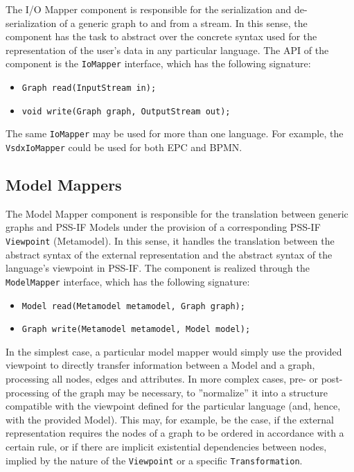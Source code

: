 The I/O Mapper component is responsible for the serialization and de-serialization of a generic graph to and from a stream. In this sense, the component has the task to abstract over the concrete syntax used for the representation of the user's data in any particular language. The API of the component is the \texttt{IoMapper} interface, which has the following signature:

\begin{itemize}
\item \texttt{Graph read(InputStream in);}
\item \texttt{void write(Graph graph, OutputStream out);}
\end{itemize}

The same \texttt{IoMapper} may be used for more than one language. For example, the \texttt{VsdxIoMapper} could be used for both EPC and BPMN.

\subsection{Model Mappers}
\label{sec:impl:comp:model}

The Model Mapper component is responsible for the translation between generic graphs and PSS-IF Models under the provision of a corresponding PSS-IF \texttt{Viewpoint} (Metamodel). In this sense, it handles the translation between the abstract syntax of the external representation and the abstract syntax of the language's viewpoint in PSS-IF. The component is realized through the \texttt{ModelMapper} interface, which has the following signature:

\begin{itemize}
\item \texttt{Model read(Metamodel metamodel, Graph graph);}
\item \texttt{Graph write(Metamodel metamodel, Model model);}
\end{itemize}

In the simplest case, a particular model mapper would simply use the provided viewpoint to directly transfer information between a Model and a graph, processing all nodes, edges and attributes. In more complex cases, pre- or post-processing of the graph may be necessary, to ''normalize'' it into a structure compatible with the viewpoint defined for the particular language (and, hence, with the provided Model). This may, for example, be the case, if the external representation requires the nodes of a graph to be ordered in accordance with a certain rule, or if there are implicit existential dependencies between nodes, implied by the nature of the \texttt{Viewpoint} or a specific \texttt{Transformation}.

